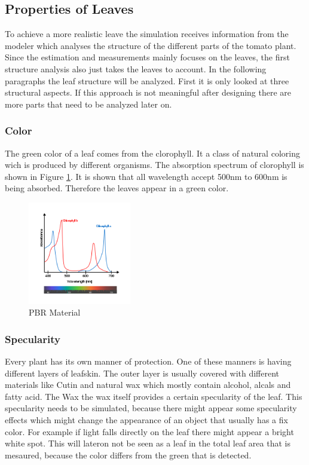 \graphicspath{{members/kh/Pictures/}}

\subsection{Properties of Leaves}

To achieve a more realistic leave the simulation receives information from the modeler which analyses the structure of the different parts of the tomato plant. Since the estimation and measurements mainly focuses on the leaves, the first structure analysis also just takes the leaves to account.
In the following paragraphs the leaf structure will be analyzed. First it is only looked at three structural aspects. If this approach is not meaningful after designing there are more parts that need to be analyzed later on.

\subsubsection{Color}
The green color of a leaf comes from the clorophyll. It a class of natural coloring wich is produced by different organisms. 
The absorption spectrum of clorophyll is shown in Figure \ref{clorophyll}. It is shown that all wavelength accept 500nm to 600nm is being absorbed. Therefore the leaves appear in a green color.

\begin{figure}[h]
	\centering
	\includegraphics[width=0.4\textwidth]{wavelength.png}
	\caption{PBR Material}
	\label{clorophyll}
\end{figure}

\subsubsection{Specularity}
Every plant has its own manner of protection. One of these manners is having different layers of leafskin. The outer layer is usually covered with different materials like Cutin and natural wax which mostly contain  alcohol, alcals and fatty acid. The Wax the wax itself provides a certain specularity of the leaf. This specularity needs to be simulated, because there might appear some specularity effects which might change the appearance of an object that usually has a fix color. For example if light falls directly on the leaf there might appear a bright white spot. This will lateron not be seen as a leaf in the total leaf area that is mesaured, because the color differs from the green that is detected.

